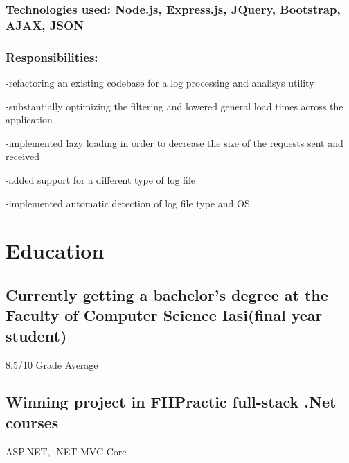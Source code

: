 \documentclass[a4paper,hidelinks,8pt]{article}
\begin{document}
\subsubsection{Technologies used: Node.js, Express.js, JQuery, Bootstrap, AJAX, JSON}
\subsubsection{Responsibilities:}
-refactoring an existing codebase for a log processing and analisys utility


-substantially optimizing the filtering and lowered general load times across the application

-implemented lazy loading in order to decrease the size of the requests sent and received

-added support for a different type of log file

-implemented automatic detection of log file type and OS


\section{Education}
\subsection{Currently getting a bachelor's degree at 
the Faculty of Computer Science Iasi(final year student)}
 8.5/10 Grade Average

\subsection{Winning project in FIIPractic full-stack .Net courses}
ASP.NET, .NET MVC Core
\end{document}
